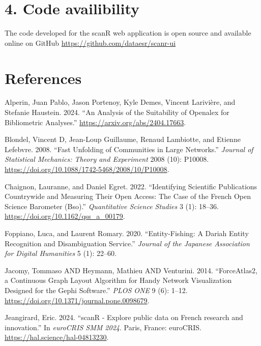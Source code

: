 \documentclass[
]{article}
\newlength{\cslhangindent}
\newenvironment{cslreferences}%
  {\setlength{\parindent}{0pt}%
  \everypar{\setlength{\hangindent}{\cslhangindent}}\ignorespaces}%
  {\par}
\begin{document}
\hypertarget{code-availibility}{%
\section{4. Code availibility}\label{code-availibility}}

The code developed for the scanR web application is open source and
available online on GitHub \url{https://github.com/dataesr/scanr-ui}

\hypertarget{references}{%
\section*{References}\label{references}}

\hypertarget{refs}{}
\begin{cslreferences}
\leavevmode\hypertarget{ref-alperin2024analysissuitabilityopenalexbibliometric}{}%
Alperin, Juan Pablo, Jason Portenoy, Kyle Demes, Vincent Larivière, and
Stefanie Haustein. 2024. ``An Analysis of the Suitability of Openalex
for Bibliometric Analyses.'' \url{https://arxiv.org/abs/2404.17663}.

\leavevmode\hypertarget{ref-Blondel_2008}{}%
Blondel, Vincent D, Jean-Loup Guillaume, Renaud Lambiotte, and Etienne
Lefebvre. 2008. ``Fast Unfolding of Communities in Large Networks.''
\emph{Journal of Statistical Mechanics: Theory and Experiment} 2008
(10): P10008. \url{https://doi.org/10.1088/1742-5468/2008/10/P10008}.

\leavevmode\hypertarget{ref-10.1162ux2fqss_a_00179}{}%
Chaignon, Lauranne, and Daniel Egret. 2022. ``Identifying Scientific
Publications Countrywide and Measuring Their Open Access: The Case of
the French Open Science Barometer (Bso).'' \emph{Quantitative Science
Studies} 3 (1): 18--36. \url{https://doi.org/10.1162/qss_a_00179}.

\leavevmode\hypertarget{ref-foppiano2020entity}{}%
Foppiano, Luca, and Laurent Romary. 2020. ``Entity-Fishing: A Dariah
Entity Recognition and Disambiguation Service.'' \emph{Journal of the
Japanese Association for Digital Humanities} 5 (1): 22--60.

\leavevmode\hypertarget{ref-10.1371ux2fjournal.pone.0098679}{}%
Jacomy, Tommaso AND Heymann, Mathieu AND Venturini. 2014. ``ForceAtlas2,
a Continuous Graph Layout Algorithm for Handy Network Visualization
Designed for the Gephi Software.'' \emph{PLOS ONE} 9 (6): 1--12.
\url{https://doi.org/10.1371/journal.pone.0098679}.

\leavevmode\hypertarget{ref-jeangirard:hal-04813230}{}%
Jeangirard, Eric. 2024. ``scanR - Explore public data on French research
and innovation.'' In \emph{euroCRIS SMM 2024}. Paris, France: euroCRIS.
\url{https://hal.science/hal-04813230}.


\end{cslreferences}
\end{document}
